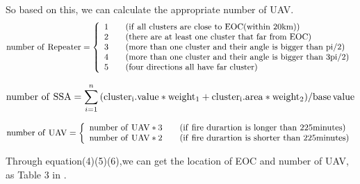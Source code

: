 \documentclass{mcmthesis}
\begin{document}
So based on this, we can calculate the appropriate number of UAV.
\begin{equation}
	{\rm number\,\,of\,\,Repeater}=\left\{
	\begin{array}{rcl}
		1 & & {\rm (if\,\, all\,\, clusters\,\, are\,\, close\,\, to\,\, EOC(within\,\, 20km))}\\
		2  & & {\rm (there\,\, are\,\, at\,\, least\,\, one\,\, cluster\,\, that\,\, far \,\,from\,\, EOC)}\\
		3 & & {\rm (more\,\, than\,\, one\, \,cluster \,\,and\,\, their \,\,angle\,\, is \,\,bigger\,\, than\,\, pi/2)}\\
		4 & & {\rm (more\,\, than\, \,one\,\, cluster \,\,and \,\,their \,\,angle \,\,is \,\,bigger \,\,than \,\,3pi/2)} \\
		5 & & {\rm (four\,\, directions\,\, all\,\, have \,\,far\, \,cluster)}
	\end{array} \right.
\end{equation}

\begin{equation}
	{\rm number\,\,of\,\,SSA}=\sum_{i=1}^n {\rm (cluster_i.value*weight_1+cluster_i.area*weight_2) / base\,value}
\end{equation}

\begin{equation}
	{\rm number\,\,of\,\,UAV}=\left\{
	\begin{array}{rcl}
		{\rm number\,\,of\,\,UAV*3} & & {\rm (if\,\,fire\,\,durartion\,\,is\,\,longer\,\,than\,\,225minutes)}\\
		{\rm number\,\,of\,\,UAV*2}  & &{\rm (if\,\,fire\,\,durartion\,\,is\,\,shorter\,\,than\,\,225minutes)}\\
	\end{array} \right.
\end{equation}

Through equation(4)(5)(6),we can get the location of EOC and number of UAV, as Table 3 in .
\end{document}
